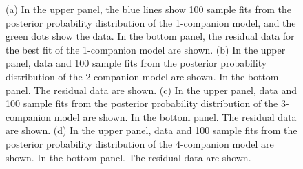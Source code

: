 \documentclass[letterpaper, preprint]{aastex}
\begin{document}
\begin{figure}
\begin{tabular}{cc}
 \end{tabular}
 \caption{(a) In the upper panel, the blue lines show 100 sample fits from the posterior probability distribution of the 1-companion model, and the green dots show the data. In the bottom panel, the residual data for the best fit of the 1-companion model are shown. (b) In the upper panel, data and 100 sample fits from the posterior probability distribution of the 2-companion model are shown. In the bottom panel. The residual data are shown. (c) In the upper panel, data and 100 sample fits from the posterior probability distribution of the 3-companion model are shown. In the bottom panel. The residual data are shown. (d) In the upper panel, data and 100 sample fits from the posterior probability distribution of the 4-companion model are shown. In the bottom panel. The residual data are shown.}
 \label{fig:282-fits}
\end{figure}
\end{document}
